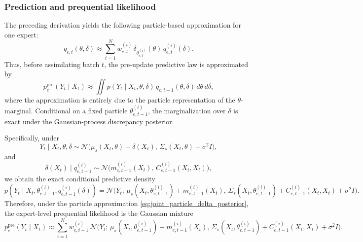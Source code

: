 \documentclass{article}
\begin{document}
\subsubsection{Prediction and prequential likelihood}
\label{sec:prediction_likelihood_online_bpc}

The preceding derivation yields the following particle-based approximation for one expert:
\begin{equation}
q_{e,t}(\theta,\delta)
\approx
\sum_{i=1}^N
w_{e,t}^{(i)}\,
\delta_{\theta_{e,t}^{(i)}}(\theta)\,
q_{e,t}^{(i)}(\delta).
\label{eq:joint_particle_delta_posterior}
\end{equation}
Thus, before assimilating batch $t$, the pre-update predictive law is approximated by
\begin{equation}
p_e^{\mathrm{pre}}(Y_t\mid X_t)
\approx
\iint
p(Y_t\mid X_t,\theta,\delta)\,
q_{e,t-1}(\theta,\delta)\,
d\theta\,d\delta,
\label{eq:preupdate_predictive_general}
\end{equation}
where the approximation is entirely due to the particle representation of the $\theta$-marginal. Conditional on a fixed particle $\theta_{e,t-1}^{(i)}$, the marginalization over $\delta$ is exact under the Gaussian-process discrepancy posterior.

Specifically, under
\begin{equation}
Y_t\mid X_t,\theta,\delta
\sim
\mathcal N\!\big(
\mu_s(X_t,\theta)+\delta(X_t),\,
\Sigma_s(X_t,\theta)+\sigma^2 I
\big),
\label{eq:full_predictive_model}
\end{equation}
and
\begin{equation}
\delta(X_t)\mid q_{e,t-1}^{(i)}
\sim
\mathcal N\!\big(
m_{e,t-1}^{(i)}(X_t),\,
C_{e,t-1}^{(i)}(X_t,X_t)
\big),
\end{equation}
we obtain the exact conditional predictive density
\begin{equation}
p(Y_t\mid X_t,\theta_{e,t-1}^{(i)},q_{e,t-1}^{(i)}(\delta))
=
\mathcal N\!\Big(
Y_t;\,
\mu_s(X_t,\theta_{e,t-1}^{(i)})+m_{e,t-1}^{(i)}(X_t),\,
\Sigma_s(X_t,\theta_{e,t-1}^{(i)})
+
C_{e,t-1}^{(i)}(X_t,X_t)
+
\sigma^2 I
\Big).
\label{eq:particle_predictive_closed_form}
\end{equation}
Therefore, under the particle approximation \eqref{eq:joint_particle_delta_posterior}, the expert-level prequential likelihood is the Gaussian mixture
\begin{equation}
p_e^{\mathrm{pre}}(Y_t\mid X_t)
\approx
\sum_{i=1}^N
w_{e,t-1}^{(i)}
\,
\mathcal N\!\Big(
Y_t;\,
\mu_s(X_t,\theta_{e,t-1}^{(i)})+m_{e,t-1}^{(i)}(X_t),\,
\Sigma_s(X_t,\theta_{e,t-1}^{(i)})
+
C_{e,t-1}^{(i)}(X_t,X_t)
+
\sigma^2 I
\Big).
\label{eq:expert_prequential_likelihood}
\end{equation}
\end{document}
